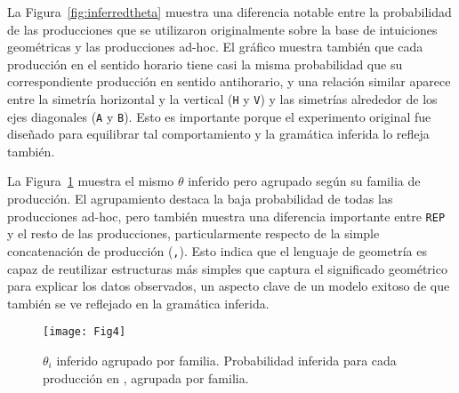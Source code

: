 La Figura~\ref{fig:inferredtheta} muestra una diferencia notable entre la probabilidad de las producciones que se utilizaron originalmente sobre la base de intuiciones geométricas y las producciones ad-hoc. El gráfico muestra también que cada producción en el sentido horario tiene casi la misma probabilidad que su correspondiente producción en sentido antihorario, y una relación similar aparece entre la simetría horizontal y la vertical (\verb#H# y \verb#V#) y las simetrías alrededor de los ejes diagonales (\verb#A# y \verb#B#). Esto es importante porque el experimento original fue diseñado para equilibrar tal comportamiento y la gramática inferida lo refleja también.


La Figura~\ref{fig:thetaGrouped} muestra el mismo $\theta$ inferido pero agrupado según su familia de producción. El agrupamiento destaca la baja probabilidad de todas las producciones ad-hoc, pero también muestra una diferencia importante entre \verb#REP# y el resto de las producciones, particularmente respecto de la simple concatenación de producción (\verb#,#). Esto indica que el lenguaje de geometría es capaz de reutilizar estructuras más simples que captura el significado geométrico para explicar los datos observados, un aspecto clave de un modelo exitoso de \lot que también se ve reflejado en la gramática inferida.

\begin{figure}[!ht]
    \centering
    \texttt{[image: Fig4]}
    \caption{$\theta_i$ inferido agrupado por familia. Probabilidad inferida para cada producción en \gramgeoprima, agrupada por familia.}
    \label{fig:thetaGrouped}
\end{figure}


